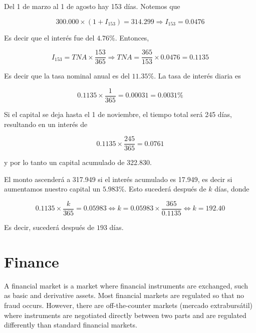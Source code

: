 \documentclass[a4paper, 12pt]{article}
\theoremstyle{definition}
\begin{document}
Del 1 de marzo al 1 de agosto hay 153 días. Notemos que 

\begin{equation*}
    300.000 \times ( 1 + I_{153} ) = 314.299 \Rightarrow I_{153} = 0.0476
\end{equation*}

Es decir que el interés fue del $4.76\%$. Entonces,

\begin{equation*}
    I_{153} = TNA \times \frac{153}{365} \Rightarrow TNA = \frac{365}{153}
    \times 0.0476 = 0.1135
\end{equation*}

Es decir que la tasa nominal anual es del $11.35\%$. La tasa de interés diaria
es 

\begin{equation*}
    0.1135 \times \frac{1}{365} = 0.00031 = 0.0031\%
\end{equation*}

Si el capital se deja hasta el 1 de noviembre, el tiempo total será 245 días,
resultando en un interés de

\begin{equation*}
    0.1135 \times \frac{245}{365} = 0.0761
\end{equation*}

y por lo tanto un capital acumulado de 322.830. 

El monto ascenderá a 317.949 si el interés acumulado es 17.949, es decir si
aumentamos nuestro capital un $5.983\%$. Esto sucederá después de $k$ días,
donde

\begin{equation*}
    0.1135 \times \frac{k}{365} = 0.05983 \iff k = 0.05983 \times
    \frac{365}{0.1135} \iff k = 192.40
\end{equation*}

Es decir, sucederá después de $193$ días.

\pagebreak
\section{Finance}

A financial market is a market where financial instruments are exchanged, such
as basic and derivative assets. Most financial markets are regulated so that no
fraud occurs. However, there are off-the-counter markets (mercado extrabursátil)
where instruments are negotiated directly between two parts and are regulated
differently than standard financial markets.
\end{document}
